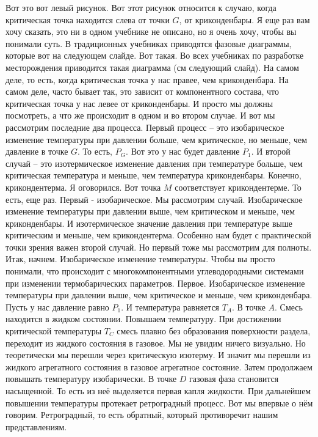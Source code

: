\documentclass[main.tex]{subfiles}
\begin{document}
Вот это вот левый рисунок.
Вот этот рисунок относится к случаю, когда критическая точка находится слева от точки $G$, от криконденбары.
Я еще раз вам хочу сказать, это ни в одном учебнике не описано, но я очень хочу, чтобы вы понимали суть.
В традиционных учебниках приводятся фазовые диаграммы, которые вот на следующем слайде.
Вот такая.
Во всех учебниках по разработке месторождения приводится
такая диаграмма (см следующий слайд).
На самом деле, то есть, когда критическая точка у нас правее, чем криконденбара.
На самом деле, часто бывает так, это зависит от компонентного состава, что критическая точка у нас левее от криконденбары.
И просто мы должны посмотреть, а что же происходит в одном
и во втором случае.
И вот мы рассмотрим последние два процесса.
Первый процесс -- это изобарическое изменение температуры при давлении больше, чем критическое, но меньше, чем давление в точке $G$.
То есть, $P_G$.
Вот это у нас будет давление $P_1$.
И второй случай -- это изотермическое изменение давления при температуре больше, чем критическая температура и меньше, чем температура криконденбары.
Конечно, крикондентерма.
Я оговорился.
Вот точка $M$ соответствует крикондентерме.
То есть, еще раз.
Первый - изобарическое.
Мы рассмотрим случай.
Изобарическое изменение температуры при давлении выше, чем критическом и меньше, чем криконденбары.
И изотермическое значение давления при температуре выше критическим и меньше, чем крикондентерма.
Особенно нам будет с практической точки зрения важен второй
случай.
Но первый тоже мы рассмотрим для полноты.
Итак, начнем.
Изобарическое изменение температуры.
Чтобы вы просто понимали, что происходит с многокомпонентными углеводородными системами при изменении термобарических параметров.
Первое.
Изобарическое изменение температуры при давлении выше, чем критическое и меньше, чем криконденбара.
Пусть у нас давление равно $P_1$.
И температура равняется $T_A$.
В точке $A$.
Смесь находится в жидком состоянии.
Повышаем температуру.
При достижении критической температуры $T_C$ смесь плавно без образования поверхности раздела, переходит из жидкого состояния в газовое.
Мы не увидим ничего визуально.
Но теоретически мы перешли через критическую изотерму.
И значит мы перешли из жидкого агрегатного состояния в газовое агрегатное состояние.
Затем продолжаем повышать температуру изобарически.
В точке $D$ газовая фаза становится насыщенной.
То есть из неё выделяется первая капля жидкости.
При дальнейшем повышении температуры протекает
ретроградный процесс.
Вот мы впервые о нём говорим.
Ретроградный, то есть обратный, который противоречит нашим представлениям.
\end{document}
